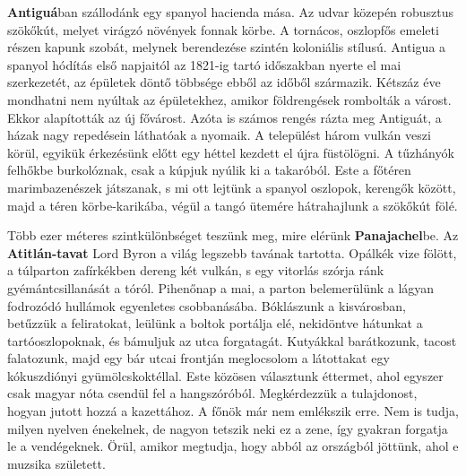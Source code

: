 \textbf{Antiguá}ban szállodánk egy spanyol hacienda mása. Az udvar közepén
robusztus szökőkút, melyet virágzó növények fonnak körbe.
A tornácos, oszlopfős emeleti részen kapunk szobát, melynek berendezése
szintén koloniális stílusú. Antigua a spanyol hódítás első napjaitól
az 1821-ig tartó időszakban nyerte el mai szerkezetét, az épületek
döntő többsége ebből az időből származik. Kétszáz éve mondhatni
nem nyúltak az épületekhez, amikor földrengések rombolták a várost.
Ekkor alapították az új fővárost. Azóta is számos rengés rázta meg
Antiguát, a házak nagy repedésein láthatóak a nyomaik. A települést
három vulkán veszi körül, egyikük érkezésünk előtt egy héttel kezdett
el újra füstölögni. A tűzhányók felhőkbe burkolóznak, csak a kúpjuk
nyúlik ki a takaróból. Este a főtéren marimbazenészek játszanak, s mi
ott lejtünk a spanyol oszlopok, kerengők között, majd a téren
körbe-karikába, végül a tangó ütemére hátrahajlunk a szökőkút fölé.

Több ezer méteres szintkülönbséget teszünk meg, mire elérünk
\textbf{Panajachel}be. Az \textbf{Atitlán-tavat} Lord Byron a világ
legszebb tavának
tartotta. Opálkék vize fölött, a túlparton zafírkékben dereng két vulkán,
s egy vitorlás szórja ránk gyémántcsillanását a tóról. Pihenőnap
a mai, a parton belemerülünk a lágyan fodrozódó hullámok egyenletes
csobbanásába. Bóklászunk a kisvárosban, betűzzük a feliratokat,
leülünk a boltok portálja elé, nekidöntve hátunkat a tartóoszlopoknak,
és bámuljuk az utca forgatagát. Kutyákkal barátkozunk, tacost
falatozunk, majd egy bár utcai frontján meglocsolom a látottakat egy
kókuszdiónyi gyümölcskoktéllal. Este közösen választunk éttermet,
ahol egyszer csak magyar nóta csendül fel a hangszóróból. Megkérdezzük
a tulajdonost, hogyan jutott hozzá a kazettához. A főnök
már nem emlékszik erre. Nem is tudja, milyen nyelven énekelnek, de
nagyon tetszik neki ez a zene, így gyakran forgatja le a vendégeknek.
Örül, amikor megtudja, hogy abból az országból jöttünk, ahol e muzsika
született.


